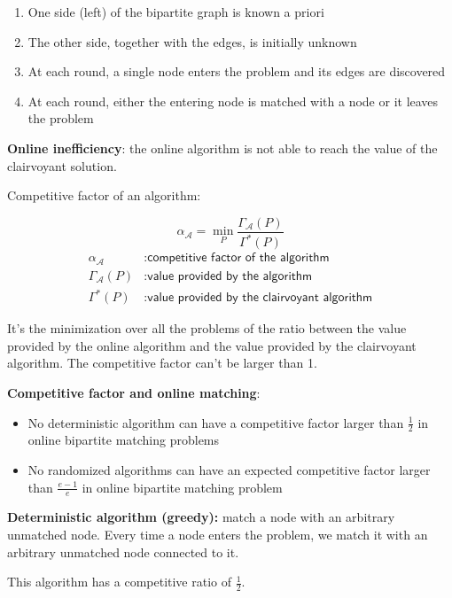 \documentclass[10pt,a4paper]{article}
\begin{document}
\begin{enumerate}

\item One side (left) of the bipartite graph is known a priori
\item The other side, together with the edges, is initially unknown
\item At each round, a single node enters the problem and its edges are discovered
\item At each round, either the entering node is matched with a node or it leaves the problem
\end{enumerate}

\textbf{Online inefficiency}: the online algorithm is not able to reach the value of the clairvoyant solution.

Competitive factor of an algorithm:

$$\alpha_{\mathscr{A}} = \min_{P} \frac{\Gamma_{\mathscr{A}}(P)}{\Gamma^*(P)}$$
$$\begin{aligned}\alpha_{\mathscr{A}} &: \textsf{competitive factor of the algorithm}\\
\Gamma_{\mathscr{A}}(P) &: \textsf{value provided by the algorithm}\\ \Gamma^*(P) &: \textsf{value provided by the clairvoyant algorithm}\end{aligned}$$

It's the minimization over all the problems of the ratio between the value provided by the online algorithm and the value provided by the clairvoyant algorithm. The competitive factor can't be larger than 1.

\textbf{Competitive factor and online matching}:

\begin{itemize}

\item No deterministic algorithm can have a competitive factor larger than $\frac{1}{2}$ in online bipartite matching problems
\item No randomized algorithms can have an expected competitive factor larger than $\frac{e-1}{e}$ in online bipartite matching problem
\end{itemize}

\textbf{Deterministic algorithm (greedy):} match a node with an arbitrary unmatched node. Every time a node enters the problem, we match it with an arbitrary unmatched node connected to it.

This algorithm has a competitive ratio of $\frac{1}{2}$.
\newline
\end{document}

